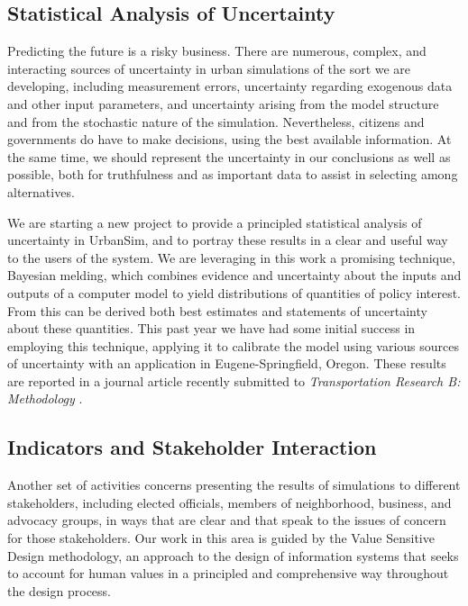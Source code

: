 \documentclass{acm_proc_article-sp}
\begin{document}
\subsection{Statistical Analysis of Uncertainty}

Predicting the future is a risky business.  There are numerous,
complex, and interacting sources of uncertainty in urban
simulations of the sort we are developing, including measurement
errors, uncertainty regarding exogenous data and other input
parameters, and uncertainty arising from the model structure and
from the stochastic nature of the simulation. Nevertheless,
citizens and governments do have to make decisions, using the best
available information.  At the same time, we should represent the
uncertainty in our conclusions as well as possible, both for
truthfulness and as important data to assist in selecting among
alternatives.

We are starting a new project to provide a principled statistical
analysis of uncertainty in UrbanSim, and to portray these results
in a clear and useful way to the users of the system.  We are
leveraging in this work a promising technique, Bayesian melding,
which combines evidence
and uncertainty about the inputs and outputs of a computer model
to yield distributions of quantities of policy interest.  From
this can be derived both best estimates and statements of
uncertainty about these quantities. This past year we have had
some initial success in employing this technique, applying it
to calibrate the model using various sources of uncertainty with
an application in Eugene-Springfield, Oregon. These results are
reported in a journal article recently submitted to 
\emph{Transportation Research B: Methodology} \cite{sevcikova-trb-2006}.

\subsection{Indicators and Stakeholder Interaction}

Another set of activities concerns presenting the results of simulations to
different stakeholders, including elected officials, members of
neighborhood, business, and advocacy groups,
in ways that are clear and that speak to the issues of concern
for those stakeholders.  Our work in this area is guided by the Value
Sensitive Design methodology, an approach to the
design of information systems that seeks to account for human values in a
principled and comprehensive way throughout the design process.
\end{document}
